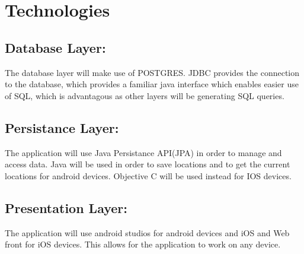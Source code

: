 \documentclass[11pt]{article}
\begin{document}
\section{Technologies}
\subsection{Database Layer:}
	The database layer will make use of POSTGRES. JDBC provides the connection to the database, which provides a familiar java interface which enables easier use of SQL, which is 	advantagous as other layers will be generating SQL queries.
\subsection{Persistance Layer:}
	The application will use Java Persistance API(JPA) in order to manage and access data.
	Java will be used in order to save locations and to get the current locations for android devices.
	Objective C will be used instead for IOS devices.
\subsection{Presentation Layer:}
		The application will use android studios for android devices and iOS and Web front for iOS devices. This allows for the application to work on any device.
\end{document}
